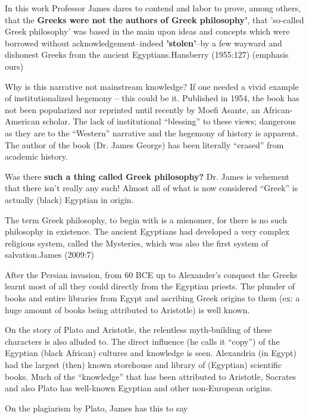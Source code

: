 \begin{myquote}
In this work Professor James dares to contend and labor to prove, among others, that the \textbf{Greeks were not the authors of Greek philosophy'}, that 'so-called Greek philosophy' was based in the main upon ideas and concepts which were borrowed without acknowledgement--indeed \textbf{'stolen'}--by a few wayward and dishonest Greeks from the ancient Egyptians.\hfill Hansberry (1955:127) (emphasis ours)
\end{myquote}

Why is this narrative not mainstream knowledge? If one needed a vivid example of institutionalized hegemony – this could be it. Published in 1954, the book has not been popularized nor reprinted until recently by Moefi Asante, an African-American scholar. The lack of institutional “blessing” to these views; dangerous as they are to the “Western” narrative and the hegemony of history is apparent. The author of the book (Dr. James George) has been literally “erased” from academic history.

Was there \textbf{such a thing called Greek philosophy?} Dr. James is vehement that there isn’t really any such! Almost all of what is now considered “Greek” is actually (black) Egyptian in origin.

\begin{myquote}
The term Greek philosophy, to begin with is a misnomer, for there is no such philosophy in existence. The ancient Egyptians had developed a very complex religious system, called the Mysteries, which was also the first system of salvation.\hfill James (2009:7)
\end{myquote}

After the Persian invasion, from 60 BCE up to Alexander’s conquest the Greeks learnt most of all they could directly from the Egyptian priests. The plunder of books and entire libraries from Egypt and ascribing Greek origins to them (ex: a huge amount of books being attributed to Aristotle) is well known.

On the story of Plato and Aristotle, the relentless myth-building of these characters is also alluded to. The direct influence (he calls it “copy”) of the Egyptian (black African) cultures and knowledge is seen. Alexandria (in Egypt) had the largest (then) known storehouse and library of (Egyptian) scientific books. Much of the “knowledge” that has been attributed to Aristotle, Socrates and also Plato has well-known Egyptian and other non-European origins.

On the plagiarism by Plato, James has this to say

